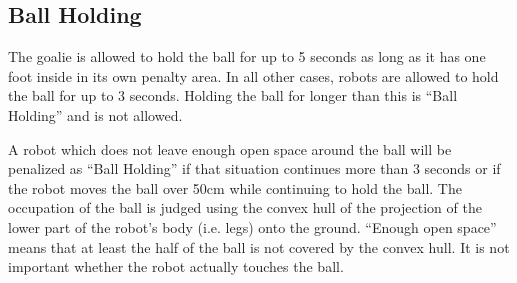 \documentclass[12pt]{article}
\begin{document}

\subsection{Ball Holding}
\label{sec:ball_holding}

The goalie is allowed to hold the ball for up to 5 seconds as long
as it has one foot inside in its own penalty area.  In all other
cases, robots are allowed to hold the ball for up to 3 seconds.
Holding the ball for longer than this is ``Ball Holding'' and is not
allowed.

A robot which does not leave enough open space around the ball will
be penalized as ``Ball Holding'' if that situation continues more
than 3 seconds or if the robot moves the ball over 50cm while continuing
to hold the ball. The occupation of the ball is judged using the convex hull of the projection of the lower part of the robot's body (i.e. legs) onto the ground. ``Enough open space'' means that at least the half of the ball is not covered by the convex hull. It is not important whether the robot actually touches the ball.
\end{document}
